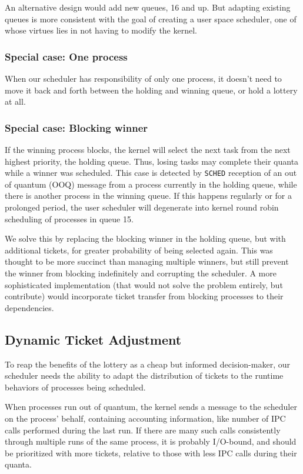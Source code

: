 \documentclass[10pt]{article}
\begin{document}
An alternative design would add new queues, 16 and up. But adapting existing queues is more consistent with the goal of creating a user space scheduler, one of whose virtues lies in not having to modify the kernel. 

\subsubsection{Special case: One process}
When our scheduler has responsibility of only one process, it doesn't need to move it back and forth between the holding and winning queue, or hold a lottery at all.

\subsubsection{Special case: Blocking winner}

If the winning process blocks, the kernel will select the next task from the next highest priority, the holding queue. Thus, losing tasks may complete their quanta while a winner was scheduled. This case is detected by \lstinline{SCHED} reception of an out of quantum (OOQ) message from a process currently in the holding queue, while there is another process in the winning queue. If this happens regularly or for a prolonged period, the user scheduler will degenerate into kernel round robin scheduling of processes in queue 15. 

We solve this by replacing the blocking winner in the holding queue, but with additional tickets, for greater probability of being selected again. This was thought to be more succinct than managing multiple winners, but still prevent the winner from blocking indefinitely and corrupting the scheduler. A more sophisticated implementation (that would not solve the problem entirely, but contribute) would incorporate ticket transfer from blocking processes to their dependencies. 

\subsection{Dynamic Ticket Adjustment}
To reap the benefits of the lottery as a cheap but informed decision-maker, our scheduler needs the ability to adapt the distribution of tickets to the runtime behaviors of processes being scheduled.

When processes run out of quantum, the kernel sends a message to the scheduler on the process' behalf, containing accounting information, like number of IPC calls performed during the last run. If there are many such calls consistently through multiple runs of the same process, it is probably I/O-bound, and should be prioritized with more tickets, relative to those with less IPC calls during their quanta.
\end{document}
